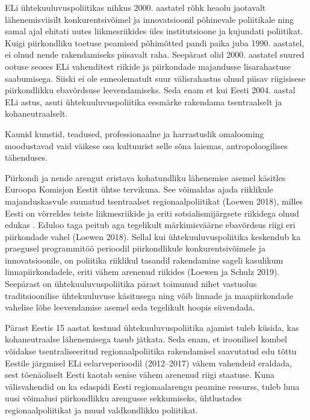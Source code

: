 \documentclass[]{book}
\begin{document}
ELi ühtekuuluvuspoliitikas nihkus 2000. aastatel rõhk heaolu jaotavalt lähenemisviisilt konkurentsivõimel ja
innovatsioonil põhinevale poliitikale ning samal ajal ehitati uutes liikmesriikides üles institutsioone ja
kujundati poliitikat. Kuigi piirkondliku toetuse peamised põhimõtted pandi paika juba 1990. aastatel, ei olnud
nende rakendamiseks piisavalt raha. Seepärast olid 2000. aastatel suured ootuse seoses ELi vahenditest
riikide ja piirkondade majandusse lisarahastuse saabumisega. Siiski ei ole enneolematult suur välisrahastus
olnud piisav riigisisese piirkondlikku ebavõrdsuse leevendamiseks. Seda enam et kui Eesti 2004. aastal ELi
astus, asuti ühtekuuluvuspoliitika eesmärke rakendama tsentraalselt ja kohaneutraalselt.

\begin{blockquote}
Kaunid kunstid, teadused, professionaalne ja harrastuslik omalooming
moodustavad vaid väikese osa kultuurist selle sõna laiemas,
antropoloogilises tähenduses.
\end{blockquote}

Piirkondi ja nende arengut eristava kohatundliku lähenemise asemel käsitles Euroopa Komisjon Eestit ühtse
tervikuna. See võimaldas ajada riiklikule majanduskasvule suunatud tsentraalset regionaalpoliitikat (Loewen
2018), milles Eesti on võrreldes teiste liikmesriikide ja eriti sotsialismijärgsete riikidega olnud edukas
\autocite{euroopakomisjon2017}. Eduloo taga peitub aga tegelikult märkimisväärne ebavõrdsus riigi eri piirkondade
vahel (Loewen 2018). Sellal kui ühtekuuluvuspoliitika keskendub ka praegusel programmitöö perioodil
piirkondlikule konkurentsivõimele ja innovatsioonile, on poliitika riiklikul tasandil rakendamine sageli
kasulikum linnapiirkondadele, eriti vähem arenenud riikides (Loewen ja Schulz 2019). Seepärast on
ühtekuuluvuspoliitika pärast toimunud nihet vastuolus traditsioonilise ühtekuuluvuse käsitusega ning võib
linnade ja maapiirkondade vahelise lõhe leevendamise asemel seda tegelikult hoopis süvendada.

Pärast Eestis 15 aastat kestnud ühtekuuluvuspoliitika ajamist tuleb küsida, kas kohaneutraalse lähenemisega
tasub jätkata. Seda enam, et iroonilisel kombel võidakse tsentraliseeritud regionaalpoliitika rakendamisel
saavutatud edu tõttu Eestile järgmisel ELi eelarveperioodil (2012--2017) vähem vahendeid eraldada, sest
tõenäoliselt Eesti kaotab senise vähem arenenud riigi staatuse. Kuna välisvahendid on ka edaspidi Eesti
regionaalarengu peamine ressurss, tuleb luua uusi võimalusi piirkondlikku arengusse sekkumiseks,
ühtlustades regionaalpoliitikat ja muud valdkondlikku poliitikat.
\end{document}
